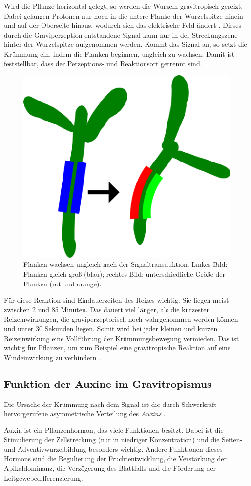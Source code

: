 \documentclass[
11pt, 
ngerman,
listof=totocnumbered,
oneside,
bibliography=totocnumbered,
abstracton
]{scrreprt}
\begin{document}
Wird die Pflanze horizontal gelegt, so werden die Wurzeln gravitropisch gereizt. Dabei gelangen Protonen nur noch in die untere Flanke der Wurzelspitze hinein und auf der Oberseite hinaus, wodurch sich das elektrische Feld ändert \parencite[502--503]{Nultsch}. Dieses durch die Graviperzeption entstandene Signal kann nur in der Streckungszone hinter der Wurzelspitze aufgenommen werden. Kommt das Signal an, so setzt die Krümmung ein, indem die Flanken beginnen, ungleich zu wachsen. Damit ist feststellbar, dass der Perzeptions- und Reaktionsort getrennt sind.

\begin{figure}[H]
	\centering 
	\includegraphics[width = 0.4\linewidth]{images/diff.png}
	\caption{Flanken wachsen ungleich nach der Signaltransduktion. Linkes Bild: Flanken gleich groß (blau); rechtes Bild: unterschiedliche Größe der Flanken (rot und orange).}
\end{figure} 

Für diese Reaktion sind Eindauerzeiten des Reizes wichtig. Sie liegen meist zwischen 2 und 85 Minuten. Das dauert viel länger, als die kürzesten Reizeinwirkungen, die graviperzeptorisch noch wahrgenommen werden können und unter 30 Sekunden liegen. Somit wird bei jeder kleinen und kurzen Reizeinwirkung eine Vollführung der Krümmungsbewegung vermieden. Das ist wichtig für Pflanzen, um zum Beispiel eine gravitropische Reaktion auf eine Windeinwirkung zu verhindern \parencite[531]{Luettge}.

\subsection{Funktion der Auxine im Gravitropismus}

Die Ursache der Krümmung nach dem Signal ist die durch Schwerkraft hervorgerufene asymmetrische Verteilung des \emph{Auxins} \parencite[502--503]{Nultsch}.

Auxin ist ein Pflanzenhormon, das viele Funktionen besitzt. Dabei ist die Stimulierung der Zellstreckung (nur in niedriger Konzentration) und die Seiten- und Adventivwurzelbildung besonders wichtig. Andere Funktionen dieses Hormons sind die Regulierung der Fruchtentwicklung, die Verstärkung der Apikaldominanz, die Verzögerung des Blattfalls und die Förderung der Leitgewebedifferenzierung.
\end{document}
